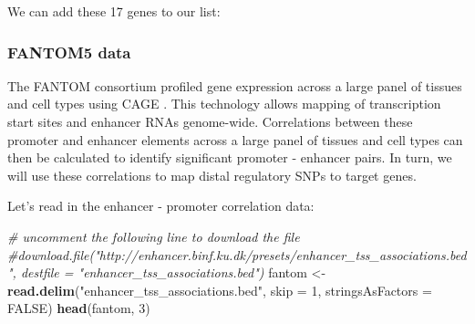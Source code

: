 \documentclass[9pt,a4paper,]{extarticle}
\newenvironment{Shaded}{\begin{snugshade}}{\end{snugshade}}
\newcommand{\KeywordTok}[1]{\textcolor[rgb]{0.13,0.29,0.53}{\textbf{#1}}}
\newcommand{\DataTypeTok}[1]{\textcolor[rgb]{0.13,0.29,0.53}{#1}}
\newcommand{\DecValTok}[1]{\textcolor[rgb]{0.00,0.00,0.81}{#1}}
\newcommand{\StringTok}[1]{\textcolor[rgb]{0.31,0.60,0.02}{#1}}
\newcommand{\CommentTok}[1]{\textcolor[rgb]{0.56,0.35,0.01}{\textit{#1}}}
\newcommand{\OtherTok}[1]{\textcolor[rgb]{0.56,0.35,0.01}{#1}}
\newcommand{\OperatorTok}[1]{\textcolor[rgb]{0.81,0.36,0.00}{\textbf{#1}}}
\newcommand{\NormalTok}[1]{#1}
\theoremstyle{definition}
\theoremstyle{definition}
\theoremstyle{definition}
\theoremstyle{remark}
\begin{document}
We can add these 17 genes to our list:

\begin{Shaded}
\end{Shaded}

\subsubsection{FANTOM5 data}\label{fantom5-data}

The FANTOM consortium profiled gene expression across a large panel of tissues and cell types using CAGE \citep{Fantom2014, Andersson2014}.
This technology allows mapping of transcription start sites and enhancer RNAs genome-wide.
Correlations between these promoter and enhancer elements across a large panel of tissues and cell types can then be calculated to identify significant promoter - enhancer pairs.
In turn, we will use these correlations to map distal regulatory SNPs to target genes.

Let's read in the enhancer - promoter correlation data:

\begin{Shaded}
\begin{Highlighting}[]
\CommentTok{# uncomment the following line to download the file}
\CommentTok{#download.file("http://enhancer.binf.ku.dk/presets/enhancer_tss_associations.bed", destfile = "enhancer_tss_associations.bed")}
\NormalTok{fantom <-}\StringTok{ }\KeywordTok{read.delim}\NormalTok{(}\StringTok{"enhancer_tss_associations.bed"}\NormalTok{, }\DataTypeTok{skip =} \DecValTok{1}\NormalTok{, }\DataTypeTok{stringsAsFactors =} \OtherTok{FALSE}\NormalTok{)}
\KeywordTok{head}\NormalTok{(fantom, }\DecValTok{3}\NormalTok{)}
\end{Highlighting}
\end{Shaded}
\end{document}
